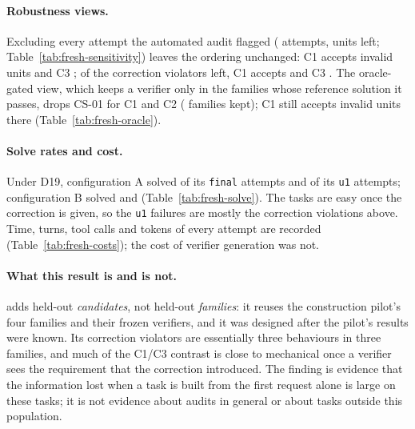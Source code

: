 \paragraph{Robustness views.} Excluding every attempt the automated audit flagged ( attempts,  units left; Table~\ref{tab:fresh-sensitivity}) leaves the ordering unchanged: C1 accepts  invalid units and C3 ; of the correction violators left, C1 accepts  and C3 . The oracle-gated view, which keeps a verifier only in the families whose reference solution it passes, drops CS-01 for C1 and C2 ( families kept); C1 still accepts  invalid units there (Table~\ref{tab:fresh-oracle}).

\paragraph{Solve rates and cost.} Under D19, configuration A solved  of its \texttt{final} attempts and  of its \texttt{u1} attempts; configuration B solved  and  (Table~\ref{tab:fresh-solve}). The tasks are easy once the correction is given, so the \texttt{u1} failures are mostly the correction violations above. Time, turns, tool calls and tokens of every attempt are recorded (Table~\ref{tab:fresh-costs}); the cost of verifier generation was not.

\paragraph{What this result is and is not.} \texttt{\FRESHRUN} adds held-out \emph{candidates}, not held-out \emph{families}: it reuses the construction pilot's four families and their frozen verifiers, and it was designed after the pilot's results were known. Its  correction violators are essentially three behaviours in three families, and much of the C1/C3 contrast is close to mechanical once a verifier sees the requirement that the correction introduced. The finding is evidence that the information lost when a task is built from the first request alone is large on these tasks; it is not evidence about audits in general or about tasks outside this population.
